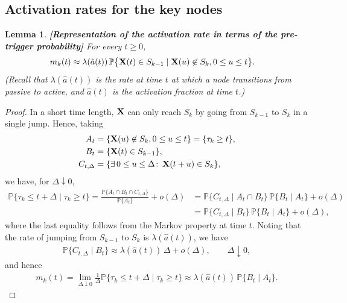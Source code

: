\documentclass[11pt]{article}
\newtheorem{Lemma}[Theorem]{Lemma}
\numberwithin{equation}{section}
\begin{document}

\subsection{Activation rates for the key nodes}
\label{ss.actrat}

\begin{Lemma}{\bf [Representation of the activation rate in terms of the pre-trigger probability]}
\label{lem:mt}
For every $t \geq 0$,
\begin{equation*}
\label{eq:mortalitysplit}
\begin{aligned}
m_k(t) &\approx \lambda(\hat{a}(t))\, \mathbb{P}\big\{{\bf X}(t) \in S_{k-1} \mid {\bf X}(u) \not \in S_{k}, 0 \leq u \leq t \big\}.
\end{aligned}
\end{equation*}
(Recall that $\lambda(\hat{a}(t))$ is the rate at time $t$ at which a node transitions from passive to active, and $\hat{a}(t)$ is the activation fraction at time $t$.)
\end{Lemma}

\begin{proof}
In a short time length, ${\bf X}$ can only reach $S_{k}$ by going from $S_{k-1}$ to $ S_{k}$ in a single jump. Hence, taking
\[
\begin{aligned}
A_t &= \{{\bf X}(u) \not \in S_{k}, 0 \leq u \leq t\}=\{\tau_k \geq t\},\\
B_t &= \{{\bf X}(t) \in S_{k-1}\},\\
C_{t,\Delta} &=  \{\exists\,0 \leq u \leq \Delta\colon\, {\bf X}(t+u) \in S_{k}\},
\end{aligned}
\]
we have, for $\Delta \downarrow 0$,
\[
\begin{aligned}
\mathbb{P}\big\{\tau_k \leq t+\Delta \mid  \tau_k \geq t\big\}
= \frac{\mathbb{P}\{A_t \cap B_t \cap C_{t,\Delta} \}}{\mathbb{P}\{A_t\}}+o(\Delta)&
= \mathbb{P}\{C_{t,\Delta} \mid A_t\cap B_t\}\,\mathbb{P}\{B_t \mid A_t\}+o(\Delta)\\&
= \mathbb{P}\{C_{t,\Delta} \mid B_t\}\,\mathbb{P}\{B_t \mid A_t\}+o(\Delta),
\end{aligned}
\]
where the last equality follows from the Markov property at time $t$. Noting that the rate of jumping from $S_{k-1}$ to $S_k$ is $\lambda(\hat{a}(t))$, we have
\begin{align*}
\mathbb{P}\{C_{t,\Delta} \mid B_t\}\approx\lambda(\hat{a}(t))\,\Delta + o(\Delta),\qquad \Delta \downarrow 0,
\end{align*}
and hence
\[
\begin{aligned}
m_k(t) =\lim_{\Delta \downarrow 0} \frac{1}{\Delta}\mathbb{P}\big\{\tau_k \leq t+\Delta \mid  \tau_k \geq t\big\}
 \approx \lambda(\hat{a}(t))\,\mathbb{P}\{B_t \mid A_t\}.
\end{aligned}
\]
\end{proof}
\end{document}

